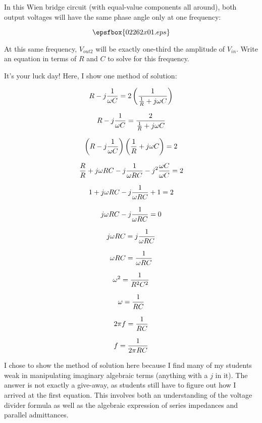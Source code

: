 

In this Wien bridge circuit (with equal-value components all around), both output voltages will have the same phase angle only at one frequency:

$$\epsfbox{02262x01.eps}$$

At this same frequency, $V_{out2}$ will be exactly one-third the amplitude of $V_{in}$.  Write an equation in terms of $R$ and $C$ to solve for this frequency.







It's your luck day!  Here, I show one method of solution:

$$R - j{1 \over \omega C} = 2 \left({1 \over {{1 \over R} + j \omega C}}\right)$$

$$R - j{1 \over \omega C} = {2 \over {{1 \over R} + j \omega C}}$$

$$\left( R - j{1 \over \omega C} \right) \left( {{1 \over R} + j \omega C} \right) = 2$$

$${R \over R} + j \omega RC - j {1 \over {\omega R C}} - j^2 {{\omega C} \over {\omega C}} = 2$$

$$1 + j \omega RC - j {1 \over {\omega R C}} + 1 = 2$$

$$j \omega RC - j {1 \over {\omega R C}} = 0$$

$$j \omega RC = j {1 \over {\omega R C}}$$

$$\omega RC = {1 \over {\omega R C}}$$

$$\omega^2 = {1 \over {R^2 C^2}}$$

$$\omega = {1 \over {R C}}$$

$$2 \pi f = {1 \over {R C}}$$

$$f = {1 \over {2 \pi R C}}$$







I chose to show the method of solution here because I find many of my students weak in manipulating imaginary algebraic terms (anything with a $j$ in it).  The answer is not exactly a give-away, as students still have to figure out how I arrived at the first equation.  This involves both an understanding of the voltage divider formula as well as the algebraic expression of series impedances and parallel admittances.

